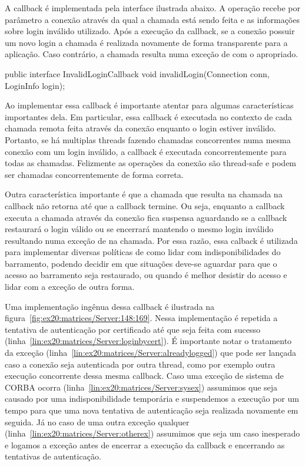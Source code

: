 A callback é implementada pela interface  ilustrada abaixo.
A operação  recebe por parâmetro a conexão através da qual a chamada está sendo feita e as informações sobre login inválido utilizado.
Após a execução da callback, se a conexão possuir um novo login a chamada é realizada novamente de forma transparente para a aplicação.
Caso contrário, a chamada resulta numa exceção de  com o  apropriado.

\begin{samplecode}
public interface InvalidLoginCallback {
  void invalidLogin(Connection conn, LoginInfo login);
}
\end{samplecode}

Ao implementar essa callback é importante atentar para algumas características importantes dela.
Em particular, essa callback é executada no contexto de cada chamada remota feita através da conexão enquanto o login estiver inválido.
Portanto, se há multiplas threads fazendo chamadas concorrentes numa mesma conexão com um login inválido, a callback é executada concorrentemente para todas as chamadas.
Felizmente as operações da conexão são thread-safe e podem ser chamadas concorrentemente de forma correta.

Outra característica importante é que a chamada que resulta na chamada na callback não retorna até que a callback termine.
Ou seja, enquanto a callback executa a chamada através da conexão fica suspensa aguardando se a callback restaurará o login válido ou se encerrará mantendo o mesmo login inválido resultando numa exceção de  na chamada.
Por essa razão, essa calback é utilizada para implementar diversas políticas de como lidar com indisponibilidades do barramento, podendo decidir em que situações deve-se aguardar para que o acesso ao barramento seja restaurado, ou quando é melhor desistir do acesso e lidar com a exceção de outra forma.

Uma implementação ingênua dessa callback é ilustrada na figura~\ref{fig:ex20:matrices/Server:148:169}.
Nessa implementação é repetida a tentativa de autenticação por certificado até que seja feita com sucesso (linha~\ref{lin:ex20:matrices/Server:loginbycert}).
É importante notar o tratamento da exceção  (linha~\ref{lin:ex20:matrices/Server:alreadylogged}) que pode ser lançada caso a conexão seja autenticada por outra thread, como por exemplo outra execução concorrente dessa mesma callback.
Caso uma exceção de sistema de CORBA ocorra (linha~\ref{lin:ex20:matrices/Server:sysex}) assumimos que seja causado por uma indisponibilidade temporária e suspendemos a execução por um tempo para que uma nova tentativa de autenticação seja realizada novamente em seguida.
Já no caso de uma outra exceção qualquer (linha~\ref{lin:ex20:matrices/Server:otherex}) assumimos que seja um caso inesperado e logamos a exceção antes de encerrar a execução da callback e encerrando as tentativas de autenticação.

